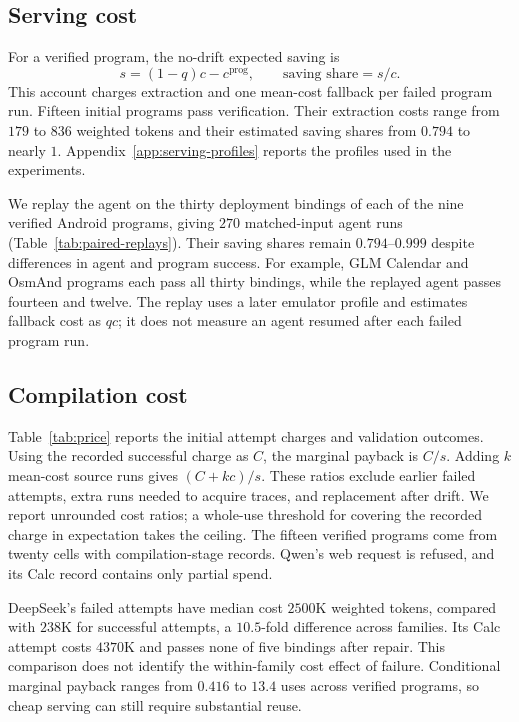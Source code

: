 \subsection{Serving cost}
\label{sec:share}

For a verified program, the no-drift expected saving is
\begin{equation}
s=(1-q)c-c^{\mathrm{prog}},\qquad\text{saving share}=s/c.
\label{eq:saving}
\end{equation}
This account charges extraction and one mean-cost fallback per failed program run.
Fifteen initial programs pass verification.
Their extraction costs range from $179$ to $836$ weighted tokens and their estimated saving shares from $0.794$ to nearly $1$.
Appendix~\ref{app:serving-profiles} reports the profiles used in the experiments.

\label{sec:paired}
We replay the agent on the thirty deployment bindings of each of the nine verified Android programs, giving $270$ matched-input agent runs (Table~\ref{tab:paired-replays}).
Their saving shares remain $0.794$--$0.999$ despite differences in agent and program success.
For example, GLM Calendar and OsmAnd programs each pass all thirty bindings, while the replayed agent passes fourteen and twelve.
The replay uses a later emulator profile and estimates fallback cost as $qc$; it does not measure an agent resumed after each failed program run.



\subsection{Compilation cost}
\label{sec:price}

Table~\ref{tab:price} reports the initial attempt charges and validation outcomes.
Using the recorded successful charge as $C$, the marginal payback is $C/s$.
Adding $k$ mean-cost source runs gives $(C+kc)/s$.
These ratios exclude earlier failed attempts, extra runs needed to acquire traces, and replacement after drift.
We report unrounded cost ratios; a whole-use threshold for covering the recorded charge in expectation takes the ceiling.
The fifteen verified programs come from twenty cells with compilation-stage records.
Qwen's web request is refused, and its Calc record contains only partial spend.



DeepSeek's failed attempts have median cost $2500$K weighted tokens, compared with $238$K for successful attempts, a $10.5$-fold difference across families.
Its Calc attempt costs $4370$K and passes none of five bindings after repair.
This comparison does not identify the within-family cost effect of failure.
Conditional marginal payback ranges from $0.416$ to $13.4$ uses across verified programs, so cheap serving can still require substantial reuse.

